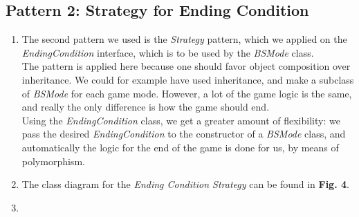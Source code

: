 \documentclass[a4paper,11pt]{article}
\begin{document}
\subsection{Pattern 2: Strategy for Ending Condition}
\begin{enumerate}
\item The second pattern we used is the \textit{Strategy} pattern, which we applied on the \textit{EndingCondition} interface, which is to be used by the \textit{BSMode} class. \\
The pattern is applied here because one should favor object composition over inheritance. We could for example have used inheritance, and make a subclass of \textit{BSMode} for each game mode. However, a lot of the game logic is the same, and really the only difference is how the  game should end.\\
Using the \textit{EndingCondition} class, we get a greater amount of flexibility: we pass the desired \textit{EndingCondition} to the constructor of a \textit{BSMode} class, and automatically the logic for the end of the game is done for us, by means of polymorphism.\\

\item The class diagram for the \textit{Ending Condition Strategy} can be found in \textbf{Fig. 4}. \\
\begin{minipage}{\linewidth}
\end{minipage}

\item
\end{enumerate}

\end{document}
